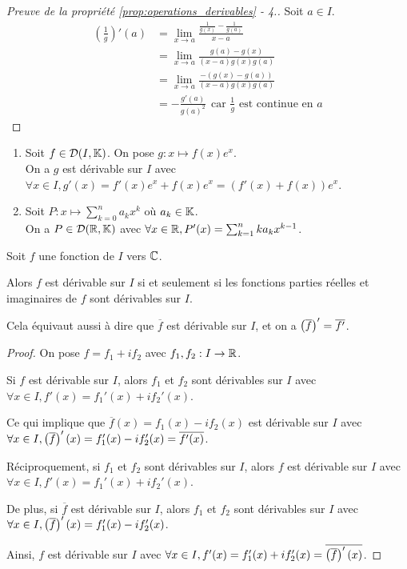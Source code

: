 \documentclass[12pt, a4paper]{report}
\begin{document}
\begin{proof}[Preuve de la propriété \ref{prop:operations_derivables} - 4.]
    Soit $a \in I$.
    \begin{align*}
        \left(\frac{1}{g}\right)'(a) &= \lim_{x\to a} \frac{\frac{1}{g(x)} - \frac{1}{g(a)}}{x-a} \\
            &= \lim_{x\to a} \frac{g(a) - g(x)}{(x-a)g(x)g(a)} \\
            &= \lim_{x\to a} \frac{-(g(x)-g(a))}{(x-a)g(x)g(a)} \\
            &= -\frac{g'(a)}{g(a)^2} ~~ \text{car } \frac1g \text{ est continue en } a
    \end{align*}
\end{proof}

\begin{example}
    \begin{enumerate}
        \item Soit $f \in \mathcal{D}(I,\mathbb{K})$. On pose $g:x\mapsto f(x)e^x$.\\On a $g$ est dérivable sur $I$ avec $\forall x \in I, g'(x) = f'(x)e^x + f(x)e^x = (f'(x) + f(x))e^x$.
        \item Soit $P:x\mapsto \sum_{k=0}^{n}a_kx^k$ où $a_k \in \mathbb{K}$.\\On a $P \in \mathcal{D}(\mathbb{R},\mathbb{K})$ avec $\forall x \in \mathbb{R}, P'(x) = \sum_{k=1}^{n}ka_kx^{k-1}$.
    \end{enumerate}
\end{example}

\begin{property}
    Soit $f$ une fonction de $I$ vers $\mathbb{C}$.

    Alors $f$ est dérivable sur $I$ si et seulement si les fonctions parties réelles et imaginaires de $f$ sont dérivables sur $I$.

    Cela équivaut aussi à dire que $\overline{f}$ est dérivable sur $I$, et on a $\left(\overline{f}\right)' = \overline{f'}$.
\end{property}

\begin{proof}
    On pose $f=f_1 + if_2$ avec $f_1, f_2 : I \to \mathbb{R}$.

    Si $f$ est dérivable sur $I$, alors $f_1$ et $f_2$ sont dérivables sur $I$ avec $\forall x \in I, f'(x) = f_1'(x) + if_2'(x)$.

    Ce qui implique que $\overline{f}(x) = f_1(x) - if_2(x)$ est dérivable sur $I$ avec $\forall x \in I, \left(\overline{f}\right)'(x) = f_1'(x) - if_2'(x) = \overline{f'(x)}$.

    Réciproquement, si $f_1$ et $f_2$ sont dérivables sur $I$, alors $f$ est dérivable sur $I$ avec $\forall x \in I, f'(x) = f_1'(x) + if_2'(x)$.

    De plus, si $\overline{f}$ est dérivable sur $I$, alors $f_1$ et $f_2$ sont dérivables sur $I$ avec $\forall x \in I, \left(\overline{f}\right)'(x) = f_1'(x) - if_2'(x)$.

    Ainsi, $f$ est dérivable sur $I$ avec $\forall x \in I, f'(x) = f_1'(x) + if_2'(x) = \overline{\left(\overline{f}\right)'(x)}$.
\end{proof}
\end{document}
